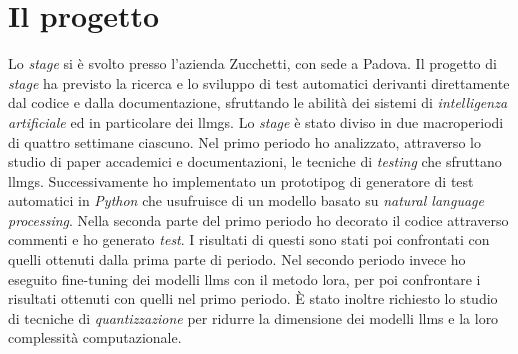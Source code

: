 \section{Il progetto}
Lo \textit{stage} si è svolto presso l'azienda Zucchetti, con sede a Padova. Il progetto di \textit{stage} ha previsto la ricerca e lo sviluppo di test automatici derivanti direttamente dal codice e dalla documentazione, sfruttando le abilità dei sistemi di \textit{intelligenza artificiale} ed in particolare dei \glspl{llmg}.
Lo \textit{stage} è stato diviso in due macroperiodi di quattro settimane ciascuno. Nel primo periodo ho analizzato, attraverso lo studio di paper accademici e documentazioni, le tecniche di \textit{testing} che sfruttano \glspl{llmg}. Successivamente ho implementato un \gls{prototipog} di generatore di test automatici in \textit{Python} che usufruisce di un modello basato su \textit{natural language processing}. Nella seconda parte del primo periodo ho decorato il codice attraverso commenti e ho generato \textit{test}. I risultati di questi sono stati poi confrontati con quelli ottenuti dalla prima parte di periodo. Nel secondo periodo invece ho eseguito \gls{fine-tuning} dei modelli \glspl{llm} con il metodo \gls{lora}, per poi confrontare i risultati ottenuti con quelli nel primo periodo.
È stato inoltre richiesto lo studio di tecniche di \textit{quantizzazione} per ridurre la dimensione dei modelli \glspl{llm} e la loro complessità computazionale.
